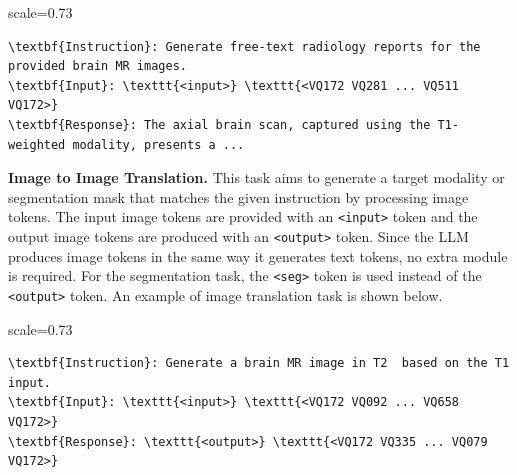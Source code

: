 \vspace{6pt}
\begin{adjustbox}{scale=0.73}
\begin{minipage}{1.35\linewidth}
\begin{Verbatim}[frame=single, numbersep=5pt,
                 commandchars=\\\{\}]
\textbf{Instruction}: Generate free-text radiology reports for the provided brain MR images.
\textbf{Input}: \texttt{<input>} \texttt{<VQ172 VQ281 ... VQ511 VQ172>}
\textbf{Response}: The axial brain scan, captured using the T1-weighted modality, presents a ...
\end{Verbatim}
\end{minipage}
\end{adjustbox}
\vspace{3pt}

\vspace{3pt}
\noindent \textbf{Image to Image Translation.}
This task aims to generate a target modality or segmentation mask that matches the given instruction by processing image tokens. The input image tokens are provided with an \texttt{<input>} token and the output image tokens are produced with an \texttt{<output>} token. Since the LLM produces image tokens in the same way it generates text tokens, no extra module is required. For the segmentation task, the \texttt{<seg>} token is used instead of the \texttt{<output>} token. An example of image translation task is shown below.

\vspace{6pt}
\begin{adjustbox}{scale=0.73}
\begin{minipage}{1.35\linewidth}
\begin{Verbatim}[frame=single, numbersep=5pt,
                 commandchars=\\\{\}]
\textbf{Instruction}: Generate a brain MR image in T2  based on the T1 input.
\textbf{Input}: \texttt{<input>} \texttt{<VQ172 VQ092 ... VQ658 VQ172>}
\textbf{Response}: \texttt{<output>} \texttt{<VQ172 VQ335 ... VQ079 VQ172>}
\end{Verbatim}
\end{minipage}
\end{adjustbox}
\vspace{3pt}

